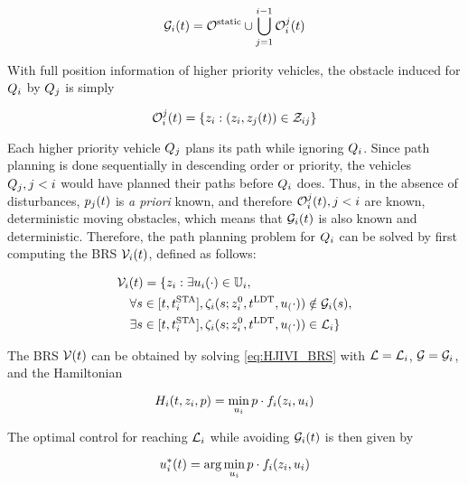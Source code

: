 \begin{equation}
\label{eq:obsseti}
\obsset_i(t)  = \soset \cup \bigcup_{j=1}^{i-1} \ioset_i^j(t)
\end{equation}

With full position information of higher priority vehicles, the obstacle induced for $Q_i$ by $Q_j$ is simply

\begin{equation}
\label{eq:ioset}
\ioset_i^j(t) = \{\state_i: (\state_i, \state_j(t)) \in \dz_{ij}\}
\end{equation}

Each higher priority vehicle $Q_j$ plans its path while ignoring $Q_i$. Since path planning is done sequentially in descending order or priority, the vehicles $Q_j, j<i$ would have planned their paths before $Q_i$ does. Thus, in the absence of disturbances, $p_j(t)$ is \textit{a priori} known, and therefore $\mathcal{O}_i^j(t), j<i$ are known, deterministic moving obstacles, which means that $\mathcal{G}_i(t)$ is also known and deterministic. Therefore, the path planning problem for $Q_i$ can be solved by first computing the BRS $\mathcal{V}_i(t)$, defined as follows:

\begin{equation}
\label{eq:BRS_basic}
\begin{aligned}
&\brs_i(t) = \{\state_i: \exists \ctrl_i(\cdot) \in \cfset_i, \\
&\quad\forall s \in [t, \sta_i], \traj_i(s; \state^0_i, \ldt, \ctrl_(\cdot)) \notin \obsset_i(s), \\
&\quad\exists s \in [t, \sta_i], \traj_i(s; \state^0_i, \ldt, \ctrl_(\cdot)) \in \targetset_i\}
\end{aligned}
\end{equation}

The BRS $\mathcal{V}(t)$ can be obtained by solving \eqref{eq:HJIVI_BRS} with $\mathcal{L} = \mathcal{L}_i$, $\mathcal{G} = \mathcal{G}_i$, and the Hamiltonian 

\begin{equation}
\label{eq:basicham}
\ham_i(t, \state_i, p) = \min_{\ctrl_i} p \cdot \fdyn_i(\state_i, \ctrl_i)
\end{equation}

The optimal control for reaching $\mathcal{L}_i$ while avoiding $\mathcal{G}_i(t)$ is then given by

\begin{equation}
\label{eq:basicOptCtrl}
\ctrl_i^*(t) = \arg \min_{\ctrl_i} p \cdot \fdyn_i(\state_i, \ctrl_i)
\end{equation}

